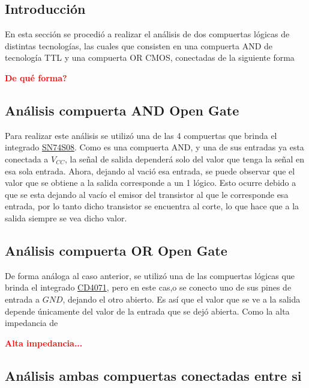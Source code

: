


\subsection{Introducción}

En esta sección se procedió a realizar el análisis de dos compuertas lógicas de distintas tecnologías, las cuales que consisten en una compuerta AND de tecnología TTL y una compuerta OR CMOS, conectadas de la siguiente forma

\begin{center}
	\huge{\textcolor{red}{\textbf{De qué forma?}}}
\end{center}

\subsection{Análisis compuerta AND Open Gate}

Para realizar este análisis se utilizó una de las 4 compuertas que brinda el integrado \href{http://www.ti.com/lit/ds/symlink/sn74s08.pdf}{SN74S08}. Como es una compuerta AND, y una de sus entradas ya esta conectada a $V_{CC}$, la señal de salida dependerá solo del valor que tenga la señal en esa sola entrada. Ahora, dejando al vació esa entrada, se puede observar que el valor que se obtiene a la salida corresponde a un 1 lógico. Esto ocurre debido a que se esta dejando al vacío el emisor del transistor al que le corresponde esa entrada, por lo tanto dicho transistor se encuentra al corte, lo que hace que a la salida siempre se vea dicho valor.

\subsection{Análisis compuerta OR Open Gate}

De forma análoga al caso anterior, se utilizó una de las compuertas lógicas que brinda el integrado \href{http://www.ti.com/lit/ds/symlink/cd4071b.pdf}{CD4071}, pero en este cas,o se conecto uno de sus pines de entrada a $GND$, dejando el otro abierto. Es así que el valor que se ve a la salida depende únicamente del valor de la entrada que se dejó abierta. Como la alta impedancia de

\begin{center}
	\huge{\textcolor{red}{\textbf{Alta impedancia...}}}
\end{center}


\subsection{Análisis ambas compuertas conectadas entre si}

